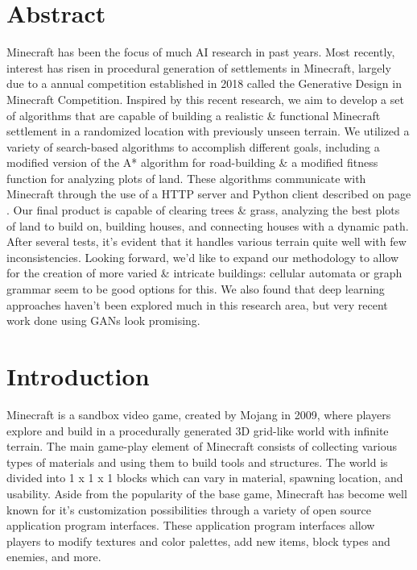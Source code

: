 \documentclass[11pt, oneside]{article}
\begin{document}
\begin{normalsize}

\section{Abstract}
\label{Abstract}

Minecraft has been the focus of much AI research in past years. Most recently, interest has risen in procedural generation of settlements in Minecraft, largely due to a annual competition established in 2018 called the Generative Design in Minecraft Competition. Inspired by this recent research, we aim to develop a set of algorithms that are capable of building a realistic \& functional Minecraft settlement in a randomized location with previously unseen terrain. We utilized a variety of search-based algorithms to accomplish different goals, including a modified version of the A* algorithm for road-building \& a modified fitness function for analyzing plots of land. These algorithms communicate with Minecraft through the use of a HTTP server and Python client described on page \pageref{Methodology}. Our final product is capable of clearing trees \& grass, analyzing the best plots of land to build on, building houses, and connecting houses with a dynamic path. After several tests, it's evident that it handles various terrain quite well with few inconsistencies. Looking forward, we'd like to expand our methodology to allow for the creation of more varied \& intricate buildings: cellular automata or graph grammar seem to be good options for this. We also found that deep learning approaches haven't been explored much in this research area, but very recent work done using GANs look promising.


\newpage

\section{Introduction}
\label{Introduction}

	Minecraft is a sandbox video game, created by Mojang in 2009, where players explore and build in a procedurally generated 3D grid-like world with infinite terrain. The main game-play element of Minecraft consists of collecting various types of materials and using them to build tools and structures. The world is divided into 1 x 1 x 1 blocks which can vary in material, spawning location, and usability. Aside from the popularity of the base game, Minecraft has become well known for it's customization possibilities through a variety of open source application program interfaces. These application program interfaces allow players to modify textures and color palettes, add new items, block types and enemies, and more. 
	

\end{normalsize}
\end{document}
